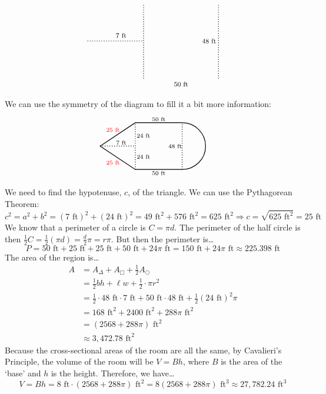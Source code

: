 \documentclass[12pt,letterpaper]{exam}
\begin{document}
\begin{questions}
\[\begin{tikzpicture}[scale=0.8]
	\draw[line width=0.03cm,dotted] (-3,0) -- (0,0);
	\draw[line width=0.03cm,dotted] (0,-2) -- (0,2);
	\draw[line width=0.03cm,dotted] (4,-2) -- (4,2);
	
	\node at (-1.2,0.3) {\footnotesize 7~ft};
	\node at (2,-2.3) {\footnotesize 50~ft};
	\node at (3.5,0) {\footnotesize 48~ft};
	\end{tikzpicture}
	\] 

\sol We can use the symmetry of the diagram to fill it a bit more information:
	\[
	\begin{tikzpicture}[scale=0.5]
	\draw[line width=0.03cm] (4,-2) -- (0,-2) -- (-3,0) -- (0,2) -- (4,2);
	\draw[line width=0.03cm] (4,-2) arc(-90:90:2);
	
	\draw[line width=0.03cm,dotted] (-3,0) -- (0,0);
	\draw[line width=0.03cm,dotted] (0,-2) -- (0,2);
	\draw[line width=0.03cm,dotted] (4,-2) -- (4,2);
	
	\node at (-1.2,0.3) {\scriptsize 7~ft};
	\node at (2,-2.3) {\scriptsize 50~ft};
	\node at (3.4,0) {\scriptsize 48~ft};
	\node at (0.7,0.9) {\scriptsize 24~ft};
	\node at (0.7,-0.9) {\scriptsize 24~ft};
	\node at (2,2.3) {\scriptsize 50~ft};
	\node at (-1.9,1.4) {\scriptsize \color{red} 25~ft};
	\node at (-1.9,-1.4) {\scriptsize \color{red} 25~ft};
	\end{tikzpicture}
	\] 

We need to find the hypotenuse, $c$, of the triangle. We can use the Pythagorean Theorem:
	\[
	c^2= a^2 + b^2= (7 \text{ ft})^2 + (24 \text{ ft})^2= 49 \text{ ft}^2 + 576 \text{ ft}^2= 625 \text{ ft}^2 \Longrightarrow c= \sqrt{625 \text{ ft}^2}= 25 \text{ ft}
	\]
We know that a perimeter of a circle is $C= \pi d$. The perimeter of the half circle is then $\frac{1}{2}C= \frac{1}{2} (\pi d)= \frac{d}{2} \pi= r \pi$. But then the perimeter is\dots
	\[
	P= 50 \text{ ft} + 25 \text{ ft} + 25 \text{ ft} + 50 \text{ ft} + 24\pi \text{ ft}= 150 \text{ ft} + 24\pi \text{ ft} \approx 225.398 \text{ ft}
	\]
The area of the region is\dots
	\[
	\begin{aligned}
	A&= A_{\Delta} + A_{\Box} + \frac{1}{2} A_{\bigcirc} \\[0.3cm]
	&= \frac{1}{2} bh + \ell w + \frac{1}{2} \cdot \pi r^2 \\[0.3cm]
	&= \frac{1}{2} \cdot 48 \text{ ft} \cdot 7 \text{ ft} + 50 \text{ ft} \cdot 48 \text{ ft} + \frac{1}{2} (24 \text{ ft})^2 \pi \\[0.3cm]
	&= 168 \text{ ft}^2 + 2400 \text{ ft}^2 + 288\pi \text{ ft}^2 \\[0.3cm]
	&= (2568 + 288\pi) \text{ ft}^2 \\[0.3cm]
	&\approx 3,\!472.78 \text{ ft}^2
	\end{aligned}
	\] 
Because the cross-sectional areas of the room are all the same, by Cavalieri's Principle, the volume of the room will be $V= Bh$, where $B$ is the area of the `base' and $h$ is the height. Therefore, we have\dots
	\[
	V= Bh= 8 \text{ ft} \cdot (2568 + 288\pi) \text{ ft}^2= 8(2568 + 288\pi) \text{ ft}^3 \approx 27,\!782.24 \text{ ft}^3
	\]




\end{questions}
\end{document}
